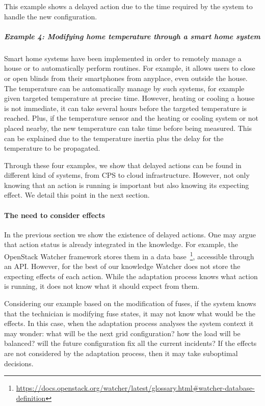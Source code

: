 This example shows a delayed action due to the time required by the system to handle the new configuration.

\subparagraph{Example 4: Modifying home temperature through a smart home system}
Smart home systems have been implemented in order to remotely manage a house or to automatically perform routines.
For example, it allows users to close or open blinds from their smartphones from anyplace, even outside the house.
The temperature can be automatically manage by such systems, for example given targeted temperature at precise time.
However, heating or cooling a house is not immediate, it can take several hours before the targeted temperature is reached.
Plus, if the temperature sensor and the heating or cooling system or not placed nearby, the new temperature can take time before being measured.
This can be explained due to the temperature inertia plus the delay for the temperature to be propagated.


Through these four examples, we show that delayed actions can be found in different kind of systems, from CPS to cloud infrastructure.
However, not only knowing that an action is running is important but also knowing its expecting effect.
We detail this point in the next section.

\paragraph{The need to consider effects}
In the previous section we show the existence of delayed actions.
One may argue that action status is already integrated in the knowledge.
For example, the OpenStack Watcher framework stores them in a data base~\footnote{\url{https://docs.openstack.org/watcher/latest/glossary.html\#watcher-database-definition}}, accessible through an API.
However, for the best of our knowledge Watcher does not store the expecting effects of each action.
While the adaptation process knows what action is running, it does not know what it should expect from them.

Considering our example based on the modification of fuses, if the system knows that the technician is modifying fuse states, it may not know what would be the effects.
In this case, when the adaptation process analyses the system context it may wonder: what will be the next grid configuration? how the load will be balanced? will the future configuration fix all the current incidents?
If the effects are not considered by the adaptation process, then it may take suboptimal decisions.

